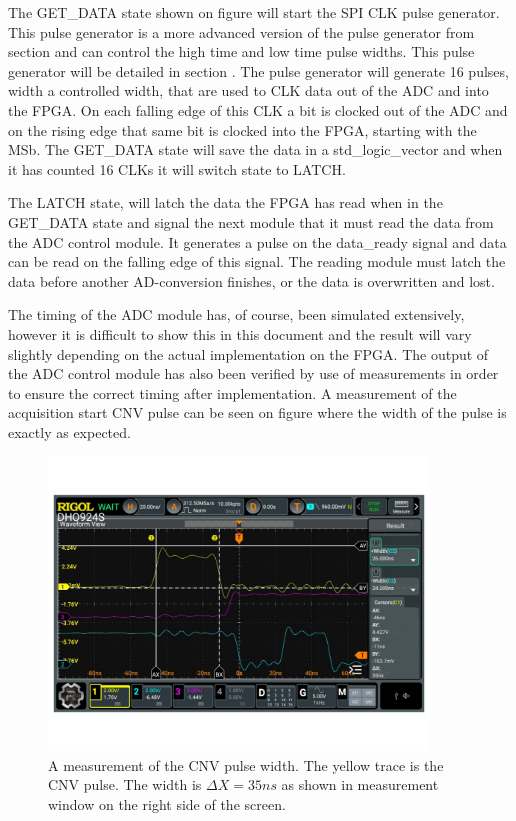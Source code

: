 The GET\_DATA state shown on figure  will start the SPI CLK pulse generator. This pulse generator is a more advanced version of the pulse generator from section  and can control the high time and low time pulse widths. This pulse generator will be detailed in section . The pulse generator will generate 16 pulses, width a controlled width, that are used to CLK data out of the ADC and into the FPGA. On each falling edge of this CLK a bit is clocked out of the ADC and on the rising edge that same bit is clocked into the FPGA, starting with the MSb. The GET\_DATA state will save the data in a std\_logic\_vector and when it has counted 16 CLKs it will switch state to LATCH.

The LATCH state, will latch the data the FPGA has read when in the GET\_DATA state and signal the next module that it must read the data from the ADC control module. It generates a pulse on the data\_ready signal and data can be read on the falling edge of this signal. The reading module must latch the data before another AD-conversion finishes, or the data is overwritten and lost.

The timing of the ADC module has, of course, been simulated extensively, however it is difficult to show this in this document and the result will vary slightly depending on the actual implementation on the FPGA. The output of the ADC control module has also been verified by use of measurements in order to ensure the correct timing after implementation. A measurement of the acquisition start CNV pulse can be seen on figure  where the width of the pulse is exactly  as expected. 

\begin{figure}[H]
    \centering
    \includegraphics[clip, trim=0 100 0 0, width=0.9\textwidth]{Sections/7_SystemDesign/Figures/7_2_8_ADCControl_CNV_MEASURE.pdf}
    \caption{A measurement of the CNV pulse width. The yellow trace is the CNV pulse. The width is $\Delta X = 35 ns$ as shown in measurement window on the right side of the screen.}
    \label{fig:7_2_8_ADC_CONTROL_CNV_MEAS}
\end{figure}

